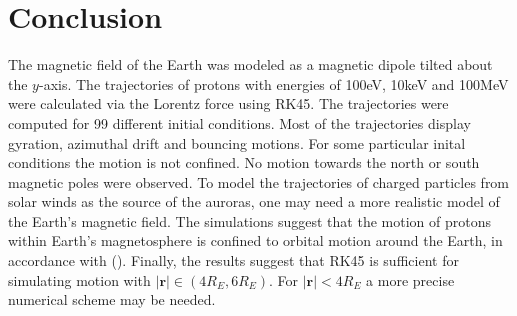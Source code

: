 \section{Conclusion}
The magnetic field of the Earth was modeled as a magnetic dipole tilted about the $y$-axis.
The trajectories of protons with energies of 100eV, 10keV and 100MeV were calculated via the Lorentz force using RK45. 
The trajectories were computed for 99 different initial conditions.
Most of the trajectories display gyration, azimuthal drift and bouncing motions. 
For some particular inital conditions the motion is not confined.
No motion towards the north or south magnetic poles were observed. 
To model the trajectories of charged particles from solar winds as the source of the auroras, one may need a more realistic model of the Earth's magnetic field. 
The simulations suggest that the motion of protons within Earth's magnetosphere is confined to orbital motion around the Earth, in accordance with (\cite{soni_2021}).
Finally, the results suggest that RK45 is sufficient for simulating motion with $|\bm{r}| \in (4R_E, 6R_E)$. 
For $|\bm{r}| < 4R_E$ a more precise numerical scheme may be needed. 